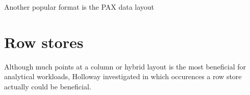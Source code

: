 Another popular format is the PAX data layout \cite{Holloway2008-rr, Bjorklund2011-wh}

\section{Row stores}
\label{sec:Row stores}
Although much points at a column or hybrid layout is the most beneficial for analytical workloads, Holloway \ea \cite{Holloway2008-rr} investigated in which occurences a row store actually could be beneficial. 



